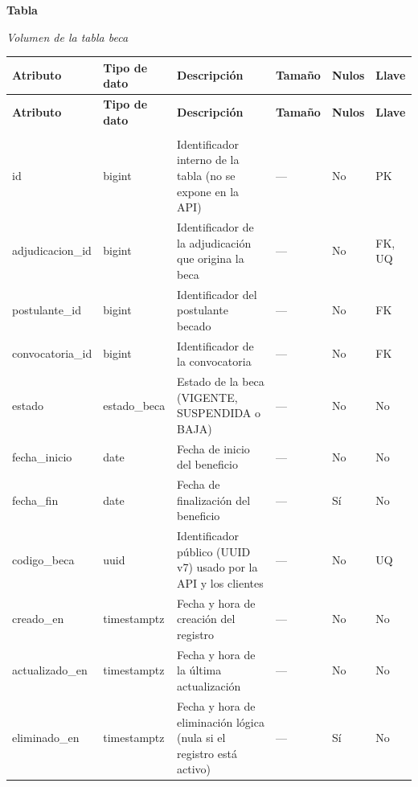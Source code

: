 \label{tab:volumen_beca}
\noindent\textbf{Tabla~\thetable}\par\nopagebreak
\noindent\textit{Volumen de la tabla beca}\par\nopagebreak
\begingroup\small\linespread{1}\selectfont\setlength{\tabcolsep}{4pt}
\begin{longtable}{>{\raggedright\arraybackslash}p{3.4cm} >{\raggedright\arraybackslash}p{2.5cm} >{\raggedright\arraybackslash}p{4.8cm} >{\centering\arraybackslash}p{1.6cm}>{\centering\arraybackslash}p{1.1cm} >{\centering\arraybackslash}p{1.3cm}}
\toprule
\textbf{Atributo} & \textbf{Tipo de dato} & \textbf{Descripción} & \textbf{Tamaño} & \textbf{Nulos} & \textbf{Llave} \\
\midrule
\endfirsthead
\toprule
\textbf{Atributo} & \textbf{Tipo de dato} & \textbf{Descripción} & \textbf{Tamaño} & \textbf{Nulos} & \textbf{Llave} \\
\midrule
\endhead
\endfoot
\bottomrule
\multicolumn{6}{l}{\textit{Nota.} Elaboración propia.} \\
\endlastfoot
id & bigint & Identificador interno de la tabla (no se expone en la API) & — & No & PK \\
adjudicacion\_\allowbreak{}id & bigint & Identificador de la adjudicación que origina la beca & — & No & FK, UQ \\
postulante\_\allowbreak{}id & bigint & Identificador del postulante becado & — & No & FK \\
convocatoria\_\allowbreak{}id & bigint & Identificador de la convocatoria & — & No & FK \\
estado & estado\_\allowbreak{}beca & Estado de la beca (VIGENTE, SUSPENDIDA o BAJA) & — & No & No \\
fecha\_\allowbreak{}inicio & date & Fecha de inicio del beneficio & — & No & No \\
fecha\_\allowbreak{}fin & date & Fecha de finalización del beneficio & — & Sí & No \\
codigo\_\allowbreak{}beca & uuid & Identificador público (UUID v7) usado por la API y los clientes & — & No & UQ \\
creado\_\allowbreak{}en & timestamptz & Fecha y hora de creación del registro & — & No & No \\
actualizado\_\allowbreak{}en & timestamptz & Fecha y hora de la última actualización & — & No & No \\
eliminado\_\allowbreak{}en & timestamptz & Fecha y hora de eliminación lógica (nula si el registro está activo) & — & Sí & No \\
\end{longtable}
\endgroup
\addtocounter{table}{-1}

